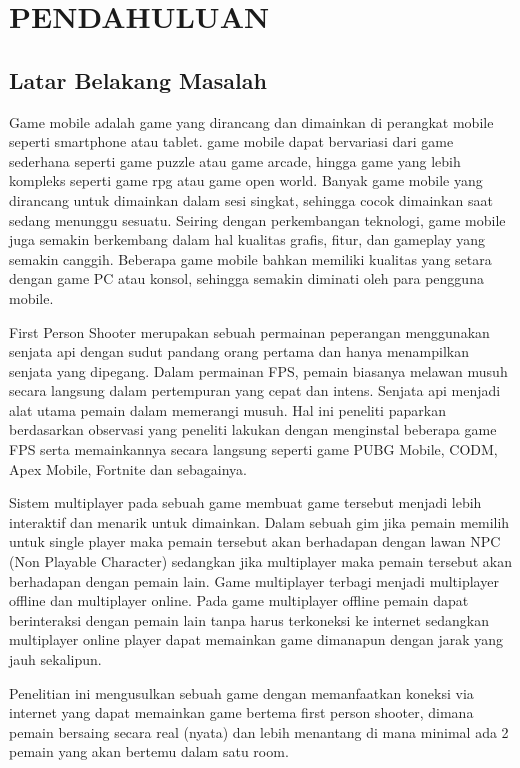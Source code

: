 \chapter{PENDAHULUAN}
\section{Latar Belakang Masalah}
 
Game mobile adalah game yang dirancang dan dimainkan di perangkat mobile seperti smartphone atau tablet. game mobile dapat bervariasi dari game sederhana seperti game puzzle atau game arcade, hingga game yang lebih kompleks seperti game rpg atau game open world. Banyak game mobile yang dirancang untuk dimainkan dalam sesi singkat, sehingga cocok dimainkan saat sedang menunggu sesuatu. Seiring dengan perkembangan teknologi, game mobile juga semakin berkembang dalam hal kualitas grafis, fitur, dan gameplay yang semakin canggih. Beberapa game mobile bahkan memiliki kualitas yang setara dengan game PC atau konsol, sehingga semakin diminati oleh para pengguna mobile.

First Person Shooter merupakan sebuah permainan peperangan menggunakan senjata api dengan sudut pandang orang pertama dan hanya menampilkan senjata yang dipegang.
Dalam permainan FPS, pemain biasanya melawan musuh secara langsung dalam pertempuran yang cepat dan intens. Senjata api menjadi alat utama pemain dalam memerangi musuh.
Hal ini peneliti paparkan berdasarkan observasi yang peneliti lakukan dengan menginstal beberapa 
game FPS serta memainkannya secara langsung seperti game PUBG Mobile, CODM, Apex Mobile, Fortnite dan sebagainya.

Sistem multiplayer pada sebuah game membuat game tersebut menjadi lebih interaktif dan menarik untuk dimainkan. Dalam sebuah gim jika pemain memilih untuk single player maka pemain tersebut akan berhadapan dengan lawan NPC (Non Playable Character) sedangkan jika multiplayer maka pemain tersebut akan berhadapan dengan pemain lain.
Game multiplayer terbagi menjadi multiplayer offline dan multiplayer online. Pada game multiplayer offline pemain dapat berinteraksi dengan pemain lain tanpa harus terkoneksi ke internet
sedangkan multiplayer online player dapat memainkan game dimanapun dengan jarak yang jauh sekalipun.

Penelitian ini mengusulkan sebuah game dengan memanfaatkan koneksi via internet yang dapat memainkan game bertema first person shooter, dimana pemain bersaing secara real (nyata) dan lebih menantang di mana minimal ada 2 pemain yang akan bertemu dalam satu room.

